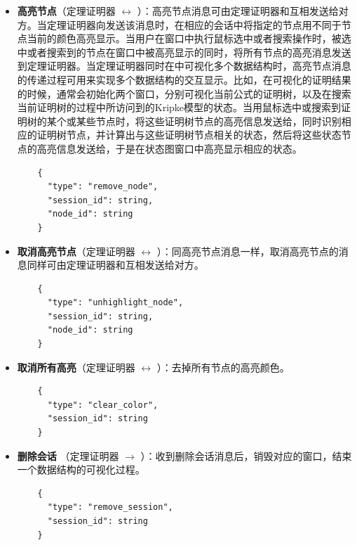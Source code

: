 \begin{itemize}
\begin{verbatim}
	  "session_id": string,
	  "node_id": string
	}
	\end{verbatim}
	\item \textbf{高亮节点}（定理证明器 $\longleftrightarrow$ ）：高亮节点消息可由定理证明器和互相发送给对方。当定理证明器向发送该消息时，在相应的会话中将指定的节点用不同于节点当前的颜色高亮显示。当用户在窗口中执行鼠标选中或者搜索操作时，被选中或者搜索到的节点在窗口中被高亮显示的同时，将所有节点的高亮消息发送到定理证明器。当定理证明器同时在中可视化多个数据结构时，高亮节点消息的传递过程可用来实现多个数据结构的交互显示。比如，在可视化\sctlprov{}的证明结果的时候，通常会初始化两个窗口，分别可视化当前公式的证明树，以及在搜索当前证明树的过程中所访问到的Kripke模型的状态。当用鼠标选中或搜索到证明树的某个或某些节点时，将这些证明树节点的高亮信息发送给\sctlprov{}，同时\sctlprov{}识别相应的证明树节点，并计算出与这些证明树节点相关的状态，然后将这些状态节点的高亮信息发送给，于是在状态图窗口中高亮显示相应的状态。
	
	\begin{verbatim}
	{
	  "type": "remove_node",
	  "session_id": string,
	  "node_id": string
	}
	\end{verbatim}
	\item \textbf{取消高亮节点}（定理证明器 $\longleftrightarrow$ ）：同高亮节点消息一样，取消高亮节点的消息同样可由定理证明器和互相发送给对方。
	\begin{verbatim}
	{
	  "type": "unhighlight_node",
	  "session_id": string,
	  "node_id": string
	}
	\end{verbatim}
	\item \textbf{取消所有高亮}（定理证明器 $\longleftrightarrow$ ）：去掉所有节点的高亮颜色。
	\begin{verbatim}
	{
	  "type": "clear_color",
	  "session_id": string
	}
	\end{verbatim}
	\item \textbf{删除会话} （定理证明器 $\longrightarrow$ ）：收到删除会话消息后，销毁对应的窗口，结束一个数据结构的可视化过程。
	\begin{verbatim}
	{
	  "type": "remove_session",
	  "session_id": string
	}
	\end{verbatim}
\end{itemize}

